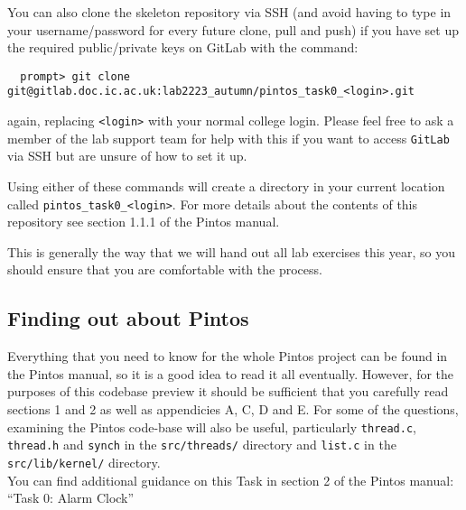 \documentclass[a4paper,12pt]{article}
\newcommand{\shell}[1]{\lstinline!#1!}
\begin{document}
You can also clone the skeleton repository via SSH (and avoid having to type in your username/password for every future clone, pull and push) if you have set up the required public/private keys on GitLab with the command:
%
\begin{lstlisting}
  prompt> git clone git@gitlab.doc.ic.ac.uk:lab2223_autumn/pintos_task0_<login>.git
\end{lstlisting}
%
again, replacing \shell{<login>} with your normal college login.
Please feel free to ask a member of the lab support team for help with this if you want to access \shell{GitLab} via SSH but are unsure of how to set it up.

Using either of these commands will create a directory in your current location called \shell{pintos_task0_<login>}.
For more details about the contents of this repository see section 1.1.1 of the Pintos manual.

This is generally the way that we will hand out all lab exercises this year, so you should ensure that you are comfortable with the process.


\subsection*{Finding out about Pintos}
Everything that you need to know for the whole Pintos project can be found in the Pintos manual, 
so it is a good idea to read it all eventually.
However, for the purposes of this codebase preview it should be sufficient that you carefully read sections 1 and 2 
as well as appendicies A, C, D and E. 
For some of the questions, examining the Pintos code-base will also be useful, 
particularly \shell{thread.c}, \shell{thread.h} and \shell{synch} in the \shell{src/threads/} directory
and \shell{list.c} in the \shell{src/lib/kernel/} directory.\\

\noindent You can find additional guidance on this Task in section 2 of the Pintos manual: ``Task 0: Alarm Clock''
\end{document}
